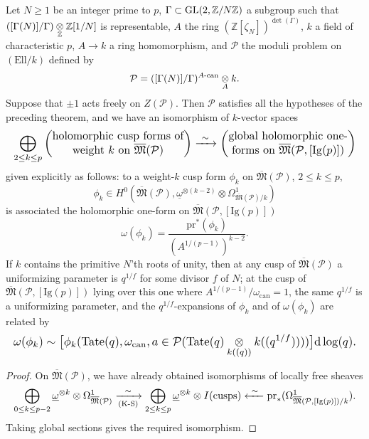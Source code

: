 \begin{kthm}[Serre]\label{thm:12.8.8}
Let $N \ge 1$ be an integer prime to $p$, $\Gamma \subset \operatorname{GL}(2, \mathbb{Z}/N\mathbb{Z})$ a subgroup such that $([\Gamma(N)]/\Gamma) \underset{\mathbb{Z}}{\otimes} \mathbb{Z}[1/N]$ is representable, $A$ the ring $(\mathbb{Z}[\zeta_N])^{\det(\Gamma)}$, $k$ a field of characteristic $p$, $A \to k$ a ring homomorphism, and $\mathcal{P}$ the moduli problem on $(\mathrm{Ell}/k)$ defined by
\[
\mathcal{P} = ([\Gamma(N)]/\Gamma)^{A\text{-\rm can}} \underset{A}{\otimes} k .
\]
Suppose that $\pm 1$ acts freely on $Z(\mathcal{P})$. Then $\mathcal{P}$ satisfies all the hypotheses of the preceding theorem, and we have an isomorphism of $k$-vector spaces
\[
\resizebox{\linewidth}{!}{$\displaystyle
\bigoplus_{2 \le k \le p} \begin{pmatrix}
\text{holomorphic cusp forms of} \\
\text{weight } k \text{ on } \overline{\mathfrak{M}}(\mathcal{P})
\end{pmatrix}
\xrightarrow{\ \sim\ }
\begin{pmatrix}
\text{global holomorphic one-} \\
\text{forms on } \overline{\mathfrak{M}}(\mathcal{P}, [\mathrm{Ig}(p)])
\end{pmatrix}
$}
\]
given explicitly as follows: to a weight-$k$ cusp form $\phi_k$ on $\overline{\mathfrak{M}}(\mathcal{P})$, $2 \le k \le p$,
\[
\phi_k \in H^0(\overline{\mathfrak{M}}(\mathcal{P}), \underline{\omega}^{\otimes(k-2)} \otimes \Omega^1_{\overline{\mathfrak{M}}(\mathcal{P})/k})
\]
is associated the holomorphic one-form on $\overline{\mathfrak{M}}(\mathcal{P}, [\mathrm{Ig}(p)])$
\[
\omega(\phi_k) = \frac{\mathrm{pr}^*(\phi_k)}{(A^{1/(p-1)})^{k-2}} .
\]
If $k$ contains the primitive $N$'th roots of unity, then at any cusp of $\overline{\mathfrak{M}}(\mathcal{P})$ a uniformizing parameter is $q^{1/f}$ for some divisor $f$ of $N$; at the cusp of $\overline{\mathfrak{M}}(\mathcal{P}, [\mathrm{Ig}(p)])$ lying over this one where $A^{1/(p-1)}/\omega_{\mathrm{can}} = 1$, the same $q^{1/f}$ is a uniformizing parameter, and the $q^{1/f}$-expansions of $\phi_k$ and of $\omega(\phi_k)$ are related by
\[
\resizebox{\linewidth}{!}{$\displaystyle
\omega(\phi_k) \sim \bigl[ \phi_k(\Tate(q), \omega_{\mathrm{can}}, a \in \mathcal{P}(\Tate(q) \tens{k((q))} k((q^{1/f})))) \bigr] \dd\log(q) .
$}
\]
\end{kthm}

\begin{proof}
On $\overline{\mathfrak{M}}(\mathcal{P})$, we have already obtained isomorphisms of locally free sheaves
\[
\resizebox{\linewidth}{!}{$\displaystyle
\bigoplus_{0 \le k \le p-2} \underline{\omega}^{\otimes k} \otimes \Omega^1_{\overline{\mathfrak{M}}(\mathcal{P})} \xrightarrow[(\mathrm{K\text{-}S})]{\ \sim\ } \bigoplus_{2 \le k \le p} \underline{\omega}^{\otimes k} \otimes I(\mathrm{cusps}) \xleftarrow{\ \sim\ } \mathrm{pr}_*(\Omega^1_{\overline{\mathfrak{M}}(\mathcal{P}, [\mathrm{Ig}(p)])/k}) .
$}
\]
Taking global sections gives the required isomorphism.
\end{proof}

